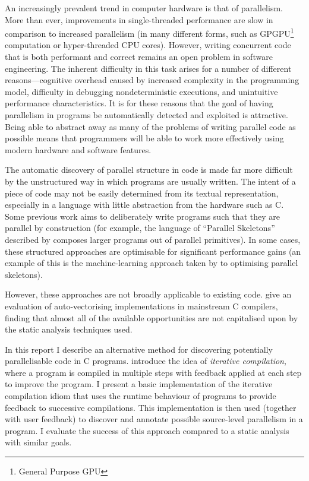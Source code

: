 \documentclass[journal]{IEEEtran}
\begin{document}
An increasingly prevalent trend in computer hardware is that of parallelism.
More than ever, improvements in single-threaded performance are slow in
comparison to increased parallelism (in many different forms, such as
GPGPU\footnote{General Purpose GPU} computation or hyper-threaded CPU cores).
However, writing concurrent code that is both performant and correct remains an
open problem in software engineering.  The inherent difficulty in this task
arises for a number of different reasons---cognitive overhead caused by
increased complexity in the programming model, difficulty in debugging
nondeterministic executions, and unintuitive performance characteristics. It is
for these reasons that the goal of having parallelism in programs be
automatically detected and exploited is attractive.  Being able to abstract away
as many of the problems of writing parallel code as possible means that
programmers will be able to work more effectively using modern hardware and
software features.

The automatic discovery of parallel structure in code is made far more difficult
by the unstructured way in which programs are usually written.  The intent of a
piece of code may not be easily determined from its textual representation,
especially in a language with little abstraction from the hardware such as C.
Some previous work aims to deliberately write programs such that they are
parallel by construction (for example, the language of ``Parallel Skeletons''
described by \textcite{gorlatch_parallel_2011} composes larger programs out of
parallel primitives). In some cases, these structured approaches are optimisable
for significant performance gains (an example of this is the machine-learning
approach taken by \textcite{collins_masif:_2013} to optimising parallel
skeletons).

However, these approaches are not broadly applicable to existing code.
\textcite{maleki_evaluation_2011} give an evaluation of auto-vectorising
implementations in mainstream C compilers, finding that almost all of the
available opportunities are not capitalised upon by the static analysis
techniques used.

In this report I describe an alternative method for discovering potentially
parallelisable code in C programs. \textcite{fursin_evaluating_2002} introduce
the idea of \emph{iterative compilation}, where a program is compiled in
multiple steps with feedback applied at each step to improve the program. I
present a basic implementation of the iterative compilation idiom that uses the
runtime behaviour of programs to provide feedback to successive compilations.
This implementation is then used (together with user feedback) to discover and
annotate possible source-level parallelism in a program. I evaluate the success
of this approach compared to a static analysis with similar goals.
\end{document}
